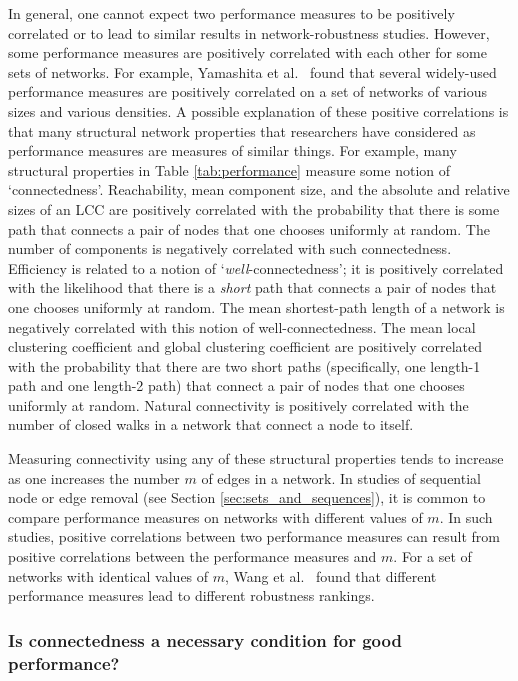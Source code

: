 \documentclass{comnet-mod}
\begin{document}
In general, one cannot expect two performance measures to be positively correlated or to lead to similar results in network-robustness studies. However, some performance measures are positively correlated with each other for some sets of networks. For example, Yamashita et al.~\cite{Yamashita2019} found that several widely-used performance measures are positively correlated on a set of networks of various sizes and various densities. A possible explanation of these positive correlations is that many structural network properties that researchers have considered as performance measures are measures of similar things. For example, many structural properties in Table \ref{tab:performance} measure some notion of `connectedness'. Reachability, mean component size, and the absolute and relative sizes of an LCC are positively correlated with the probability that there is some path that connects a pair of nodes that one chooses uniformly at random. The number of components is negatively correlated with such connectedness. Efficiency is related to a notion of `\textit{well}-connectedness'; it is positively correlated with the likelihood that there is a \textit{short} path that connects a pair of nodes that one chooses uniformly at random. The mean shortest-path length of a network is negatively correlated with this notion of well-connectedness. The mean local clustering coefficient and global clustering coefficient are positively correlated with the probability that there are two short paths (specifically, one length-1 path and one length-2 path) that connect a pair of nodes that one chooses uniformly at random. Natural connectivity is positively correlated with the number of closed walks in a network that connect a node to itself.

Measuring connectivity using any of these structural properties tends to increase as one increases the number $m$ of edges in a network. 
In studies of sequential node or edge removal (see Section \ref{sec:sets_and_sequences}), it is common to compare performance measures on networks with different values of $m$. In such studies, positive correlations between two performance measures can result from positive correlations between the performance measures and $m$. For a set of networks with identical values of $m$, Wang et al.~\cite{Wang2018} found that different performance measures lead to different robustness rankings.


\subsubsection{Is connectedness a necessary condition for good performance?}
\end{document}
